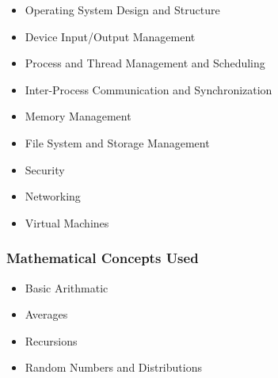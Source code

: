 {\begin{highlight}[\CSPBOS]
        \begin{itemize}
            \item Operating System Design and Structure
            \item Device Input/Output Management
            \item Process and Thread Management and Scheduling
            \item Inter-Process Communication and Synchronization
            \item Memory Management
            \item File System and Storage Management
            \item Security
            \item Networking
            \item Virtual Machines
        \end{itemize}
        
        \subsubsection*{Mathematical Concepts Used}
        
        \begin{itemize}
            \item Basic Arithmatic
            \item Averages
            \item Recursions
            \item Random Numbers and Distributions
        \end{itemize}
    \end{highlight}
}